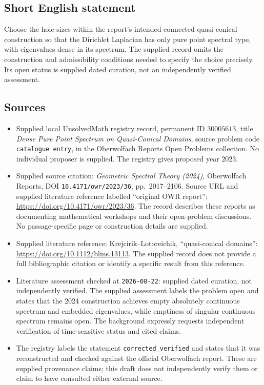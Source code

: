 \documentclass[11pt]{article}
\begin{document}
\subsection{Short English statement}
Choose the hole sizes within the report's intended connected quasi-conical construction so that the Dirichlet Laplacian has only pure point spectral type, with eigenvalues dense in its spectrum. The supplied record omits the construction and admissibility conditions needed to specify the choice precisely. Its open status is supplied dated curation, not an independently verified assessment.
\subsection{Sources}
\begin{itemize}
\item Supplied local UnsolvedMath registry record, permanent ID \(30005613\), title \emph{Dense Pure Point Spectrum on Quasi-Conical Domains}, source problem code \texttt{catalogue entry}, in the Oberwolfach Reports Open Problems collection. No individual proposer is supplied. The registry gives proposed year \(2023\).
\item Supplied source citation: \emph{Geometric Spectral Theory (2024)}, Oberwolfach Reports, DOI \texttt{10.4171/owr/2023/36}, pp.\ 2017--2106. Source URL and supplied literature reference labelled ``original OWR report'': \url{https://doi.org/10.4171/owr/2023/36}. The record describes these reports as documenting mathematical workshops and their open-problem discussions. No passage-specific page or construction details are supplied.
\item Supplied literature reference: Krejcirik--Lotoreichik, ``quasi-conical domains'': \url{https://doi.org/10.1112/blms.13113}. The supplied record does not provide a full bibliographic citation or identify a specific result from this reference.
\item Literature assessment checked at \texttt{2026-08-22}: supplied dated curation, not independently verified. The supplied assessment labels the problem open and states that the 2024 construction achieves empty absolutely continuous spectrum and embedded eigenvalues, while emptiness of singular continuous spectrum remains open. The background expressly requests independent verification of time-sensitive status and cited claims.
\item The registry labels the statement \texttt{corrected\_verified} and states that it was reconstructed and checked against the official Oberwolfach report. These are supplied provenance claims; this draft does not independently verify them or claim to have consulted either external source.
\end{itemize}
\end{document}
